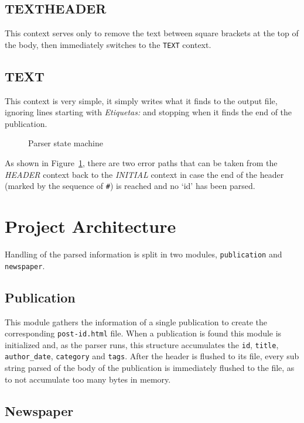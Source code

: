 \documentclass[a4paper]{report}
\begin{document}
\subsection{TEXTHEADER}

This context serves only to remove the text between square brackets at the top
of the body, then immediately switches to the \texttt{TEXT} context.

\subsection{TEXT}

This context is very simple, it simply writes what it finds to the output file,
ignoring lines starting with \textit{Etiquetas:} and stopping when it finds the
end of the publication.

\begin{figure}[H]
    
    \caption{Parser state machine}\label{fig:parser_state_machine}
\end{figure}

As shown in Figure~\ref{fig:parser_state_machine}, there are two error paths
that can be taken from the \textit{HEADER} context back to the \textit{INITIAL}
context in case the end of the header (marked by the sequence of \verb!#!) is
reached and no `id' has been parsed.

\section{Project Architecture}

Handling of the parsed information is split in two modules,
\texttt{publication} and \texttt{newspaper}.

\subsection{Publication}

This module gathers the information of a single publication to create the
corresponding \texttt{post-id.html} file. When a publication is found this
module is initialized and, as the parser runs, this structure accumulates the
\texttt{id}, \texttt{title}, \texttt{author\_date}, \texttt{category} and
\texttt{tags}. After the header is flushed to its file, every sub
string parsed of the body of the publication is immediately flushed to the file,
as to not accumulate too many bytes in memory.

\subsection{Newspaper}
\end{document}
